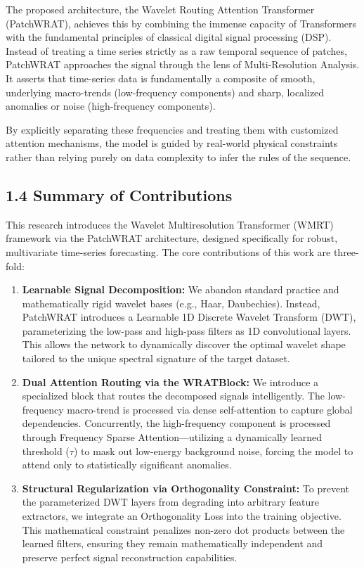 \documentclass[11pt, letterpaper]{article}
\begin{document}
The proposed architecture, the Wavelet Routing Attention Transformer (PatchWRAT), achieves this by combining the immense capacity of Transformers with the fundamental principles of classical digital signal processing (DSP). Instead of treating a time series strictly as a raw temporal sequence of patches, PatchWRAT approaches the signal through the lens of Multi-Resolution Analysis. It asserts that time-series data is fundamentally a composite of smooth, underlying macro-trends (low-frequency components) and sharp, localized anomalies or noise (high-frequency components). 

By explicitly separating these frequencies and treating them with customized attention mechanisms, the model is guided by real-world physical constraints rather than relying purely on data complexity to infer the rules of the sequence.

\subsection{1.4 Summary of Contributions}
This research introduces the Wavelet Multiresolution Transformer (WMRT) framework via the PatchWRAT architecture, designed specifically for robust, multivariate time-series forecasting. The core contributions of this work are three-fold:

\begin{enumerate}
    \item \textbf{Learnable Signal Decomposition:} We abandon standard practice and mathematically rigid wavelet bases (e.g., Haar, Daubechies). Instead, PatchWRAT introduces a Learnable 1D Discrete Wavelet Transform (DWT), parameterizing the low-pass and high-pass filters as 1D convolutional layers. This allows the network to dynamically discover the optimal wavelet shape tailored to the unique spectral signature of the target dataset.
    \item \textbf{Dual Attention Routing via the WRATBlock:} We introduce a specialized block that routes the decomposed signals intelligently. The low-frequency macro-trend is processed via dense self-attention to capture global dependencies. Concurrently, the high-frequency component is processed through Frequency Sparse Attention—utilizing a dynamically learned threshold ($\tau$) to mask out low-energy background noise, forcing the model to attend only to statistically significant anomalies.
    \item \textbf{Structural Regularization via Orthogonality Constraint:} To prevent the parameterized DWT layers from degrading into arbitrary feature extractors, we integrate an Orthogonality Loss into the training objective. This mathematical constraint penalizes non-zero dot products between the learned filters, ensuring they remain mathematically independent and preserve perfect signal reconstruction capabilities.
\end{enumerate}
\end{document}
